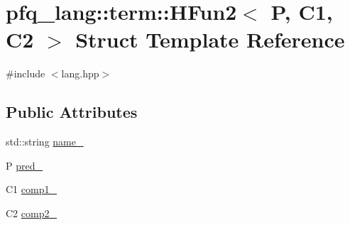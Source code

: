 \hypertarget{structpfq__lang_1_1term_1_1HFun2}{\section{pfq\+\_\+lang\+:\+:term\+:\+:H\+Fun2$<$ P, C1, C2 $>$ Struct Template Reference}
\label{structpfq__lang_1_1term_1_1HFun2}
}


{\ttfamily \#include $<$lang.\+hpp$>$}

\subsection*{Public Attributes}
\begin{DoxyCompactItemize}
\item 
std\+::string \hyperlink{structpfq__lang_1_1term_1_1HFun2_aa3808dccb93ad00cfd0be7caa80f30b9}{name\+\_\+}
\item 
P \hyperlink{structpfq__lang_1_1term_1_1HFun2_aa33f80727f25efed1112901cbcf1098a}{pred\+\_\+}
\item 
C1 \hyperlink{structpfq__lang_1_1term_1_1HFun2_a7c395ee57e98d0991b54984ed3da65a8}{comp1\+\_\+}
\item 
C2 \hyperlink{structpfq__lang_1_1term_1_1HFun2_a9d891e5539b5140e3ba2c4a02c9ac1fb}{comp2\+\_\+}
\end{DoxyCompactItemize}


